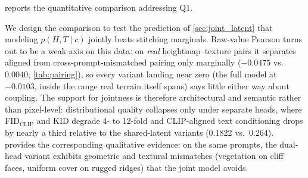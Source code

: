\documentclass[review]{vgtc}                 %
\begin{document}
 reports the quantitative comparison addressing Q1.
\begin{table}[t]
  \caption{Quantitative comparison over 496 generations (124 held-out prompts $\times$ 4 seeds). The Random-pairing row reuses the full model's textures with cross-prompt-mismatched heightmaps, so its texture-quality and alignment columns coincide with the full model's by construction---only the coupling column differs. The ground-truth row reports the coupling statistic on real validation pairs. Texture quality: KID$\downarrow$, FID$_{\text{CLIP}}\downarrow$; text alignment: CLIP Score$\uparrow$; geometry and texture coupling: Pearson$\uparrow$.}
  \label{tab:main}
  \centering%
\end{table}

We design the comparison to test the prediction of \cref{sec:joint_latent} that modeling $p(H, T \mid c)$ jointly beats stitching marginals. Raw-value Pearson turns out to be a weak axis on this data: on \emph{real} heightmap--texture pairs it separates aligned from cross-prompt-mismatched pairing only marginally ($-0.0475$ vs.\ $0.0040$; \cref{tab:pairing}), so every variant landing near zero (the full model at $-0.0103$, inside the range real terrain itself spans) says little either way about coupling. The support for jointness is therefore architectural and semantic rather than pixel-level: distributional quality collapses only under separate heads, where FID$_{\text{CLIP}}$ and KID degrade 4- to 12-fold and CLIP-aligned text conditioning drops by nearly a third relative to the shared-latent variants (0.1822 vs.\ 0.264).
 provides the corresponding qualitative evidence: on the same prompts, the dual-head variant exhibits geometric and textural mismatches (vegetation on cliff faces, uniform cover on rugged ridges) that the joint model avoids.
\end{document}
